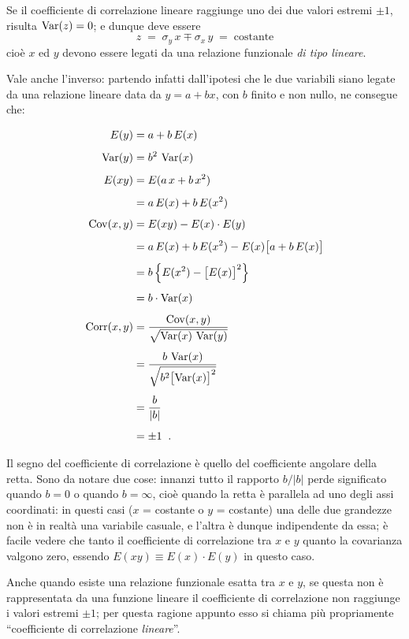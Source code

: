 Se il coefficiente di correlazione lineare raggiunge uno dei
due valori estremi $\pm 1$, risulta $\operatorname{Var}(z) = 0$; e dunque
deve essere
\begin{equation*}
  z \; = \; \sigma_y \, x \mp \sigma_x \, y
  \; = \; \text{costante}
\end{equation*}
cio\`e $x$ ed $y$ devono essere legati da una relazione
funzionale \emph{di tipo lineare}.

Vale anche l'inverso: partendo infatti dall'ipotesi che le
due variabili siano legate da una relazione lineare data da
$ y =a + b x $, con $b$ finito e non nullo, ne consegue che:

\begin{align*}
  E(y) &= a + b \, E(x) \\[1ex]
  \operatorname{Var} (y) &= b^2 \, \operatorname{Var}(x) \\[1ex]
  E(xy) &= E(a \, x + b\, x^2) \\[1ex]
  &= a \, E(x) + b \, E(x^2) \\[1ex]
  \operatorname{Cov} (x, y) &= E(xy) - E(x) \cdot E(y) \\[1ex]
  &= a \, E(x) + b \, E(x^2) - E(x)
    \bigl[ a + b \, E(x) \bigr] \\[1ex]
  &= b \left\{ E(x^2) - \bigl[ E(x)
    \bigr] ^2 \right\} \\[1ex]
  &= b \cdot \operatorname{Var}(x) \\[1ex]
  \operatorname{Corr} (x, y) &= \frac{\operatorname{Cov} (x, y)}
    {\sqrt{ \operatorname{Var}(x) \, \operatorname{Var}(y) }} \\[1ex]
  &= \frac{ b \, \operatorname{Var}(x) } {\sqrt{ b^2
    \bigl[ \operatorname{Var}(x) \bigr] ^2 }} \\[1ex]
  &= \frac{b}{|b|} \\[1ex]
  &= \pm 1 \;\; .
\end{align*}

Il segno del coefficiente di correlazione \`e quello del
coefficiente angolare della retta.  Sono da notare due cose:
innanzi tutto il rapporto $b / |b|$ perde significato quando
$b = 0$ o quando $b = \infty$, cio\`e quando la retta \`e
parallela ad uno degli assi coordinati: in questi casi ($x$
= costante o $y$ = costante) una delle due grandezze non \`e
in realt\`a una variabile casuale, e l'altra \`e dunque
indipendente da essa; \`e facile vedere che tanto il
coefficiente di correlazione tra $x$ e $y$ quanto la
covarianza valgono zero, essendo $E(xy) \equiv E(x) \cdot
E(y)$ in questo caso.

Anche quando esiste una relazione funzionale esatta tra $x$
e $y$, se questa non \`e rappresentata da una funzione
lineare il coefficiente di correlazione non raggiunge i
valori estremi $\pm 1 $; per questa ragione appunto esso si
chiama pi\`u propriamente ``coefficiente di correlazione
\emph{lineare}''.%

